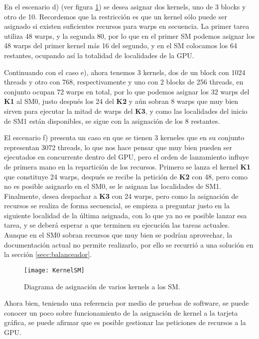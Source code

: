     En el escenario d) (ver figura \ref{fig:KernelSM}) se desea asignar dos kernels, uno de 3 blocks y otro de 10. Recordemos que la restricción es que un kernel sólo puede ser asignado si existen suficientes recursos para warps en secuencia. La primer tarea utiliza 48 warps, y la segunda 80, por lo que en el primer SM podemos asignar los 48 warps del primer kernel más 16 del segundo, y en el SM colocamos los 64 restantes, ocupando así la totalidad de localidades de la GPU.
    \newline
    
    Continuando con el caso e), ahora tenemos 3 kernels, dos de un block con 1024 threads y otro con 768, respectivamente y uno con 2 blocks de 256 threads, en conjunto ocupan 72 warps en total, por lo que podemos asignar los 32 warps del \textbf{K1} al SM0, justo después los 24 del \textbf{K2} y aún sobran 8 warps que muy bien sirven para ejecutar la mitad de warps del \textbf{K3}, y como las localidades del inicio de SM1 están disponibles, se sigue con la asignación de los 8 restantes.
    \newline
    
    El escenario f) presenta un caso en que se tienen 3 kerneles que en su conjunto representan 3072 threads, lo que nos hace pensar que muy bien pueden ser ejecutados en concurrente dentro del GPU, pero el orden de lanzamiento influye de primera mano en la repartición de los recursos. Primero se lanza el kernel \textbf{K1} que constituye 24 warps, después se recibe la petición de  \textbf{K2} con 48, pero como no es posible asignarlo en el SM0, se le asignan las localidades de SM1. Finalmente, desea despachar a \textbf{K3} con 24 warps, pero como la asignación de recursos se realiza de forma secuencial, se empieza a preguntar justo en la siguiente localidad de la última asignada, con lo que ya no es posible lanzar esa tarea, y se deberá esperar a que terminen su ejecución las tareas actuales. Aunque en el SM0 sobran recursos que muy bien se podrían aprovechar, la documentación actual no permite realizarlo, por ello se recurrió a una solución en la sección \ref{secc:balanceador}.
    
    \begin{figure}[ht]
      \centering
        \texttt{[image: KernelSM]}
        \caption{Diagrama de asignación de varios kernels a los SM.}
        \label{fig:KernelSM}
    \end{figure}
   
   Ahora bien, teniendo una referencia por medio de pruebas de software, se puede conocer un poco sobre funcionamiento de la asignación de kernel a la tarjeta gráfica, se puede afirmar que es posible gestionar las peticiones de recursos a la GPU.
\newline
    
